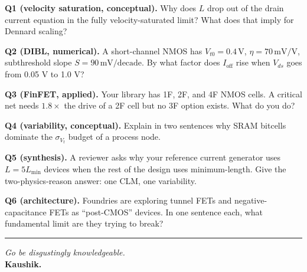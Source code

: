\documentclass[11pt]{article}
\begin{document}
\textbf{Q1 (velocity saturation, conceptual).} Why does $L$ drop out of the drain current equation in the fully velocity-saturated limit? What does that imply for Dennard scaling?

\textbf{Q2 (DIBL, numerical).} A short-channel NMOS has $V_{t0} = 0.4\,\text{V}$, $\eta = 70\,\text{mV/V}$, subthreshold slope $S = 90\,\text{mV/decade}$. By what factor does $I_{\text{off}}$ rise when $V_{ds}$ goes from 0.05 V to 1.0 V?

\textbf{Q3 (FinFET, applied).} Your library has 1F, 2F, and 4F NMOS cells. A critical net needs $1.8\times$ the drive of a 2F cell but no 3F option exists. What do you do?

\textbf{Q4 (variability, conceptual).} Explain in two sentences why SRAM bitcells dominate the $\sigma_{V_t}$ budget of a process node.

\textbf{Q5 (synthesis).} A reviewer asks why your reference current generator uses $L = 5L_{\min}$ devices when the rest of the design uses minimum-length. Give the two-physics-reason answer: one CLM, one variability.

\textbf{Q6 (architecture).} Foundries are exploring tunnel FETs and negative-capacitance FETs as ``post-CMOS'' devices. In one sentence each, what fundamental limit are they trying to break?

\vspace{1em}
\hrule
\vspace{1em}

\begin{center}
\textit{Go be disgustingly knowledgeable.}\\
\textbf{Kaushik.}
\end{center}
\end{document}
